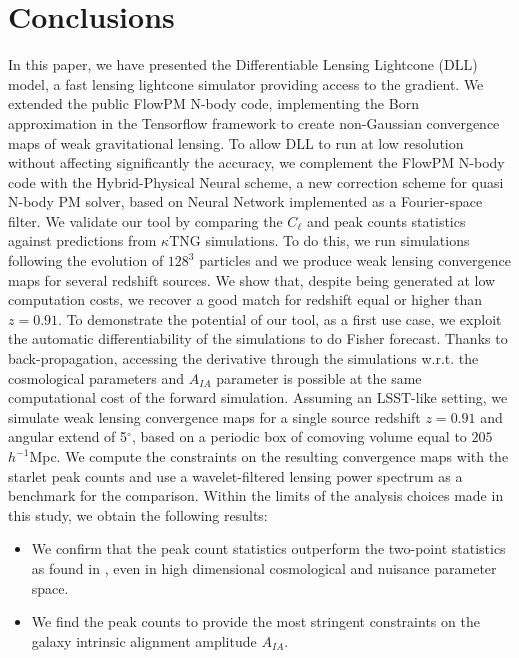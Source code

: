 \documentclass{aa}
\begin{document}
\section{Conclusions}\label{Conclusions}
In this paper, we have presented the Differentiable Lensing Lightcone (DLL) model, a fast lensing lightcone simulator providing access to the gradient. 
We extended the public FlowPM N-body code, implementing the Born approximation in the Tensorflow framework to create non-Gaussian convergence maps of weak gravitational lensing. To allow DLL to run at low resolution without affecting significantly the accuracy, we complement the FlowPM N-body code with the Hybrid-Physical Neural scheme, a new correction scheme for quasi N-body PM solver, based on Neural Network implemented as a Fourier-space filter. 
We validate our tool by comparing the $C_{\ell}$ and peak counts statistics against predictions from $\kappa$TNG simulations. 
To do this, we run simulations following the evolution of $128^3$ particles and we produce weak lensing convergence maps for several redshift sources. 
We show that, despite being generated at low computation costs, we recover a good match for redshift equal or higher than $z=0.91$. 
To demonstrate the potential of our tool, as a first use case, we exploit the automatic differentiability of the simulations to do Fisher forecast. 
Thanks to back-propagation, accessing the derivative through the simulations w.r.t. the cosmological parameters and $A_{IA}$ parameter is possible at the same computational cost of the forward simulation.
Assuming an LSST-like setting, we simulate weak lensing convergence maps for a single source redshift $z=0.91$ and angular extend of 5$^\circ$, based on a periodic box of
comoving volume equal to  $205$ $h^{-1}$Mpc.
We compute the constraints on the resulting convergence maps
with the starlet peak counts and use a wavelet-filtered lensing power spectrum as a benchmark for the comparison.
 Within the limits of the analysis choices made in this study, we obtain the following results:
\begin{itemize}
    \item  We confirm that the peak count statistics outperform the two-point statistics as found in \cite{ajani2020constraining},
 even in high dimensional cosmological and nuisance parameter space.
    \item We find the peak counts to provide the most stringent constraints on the galaxy intrinsic alignment amplitude $A_{IA}$. 
\end{itemize}
\end{document}
